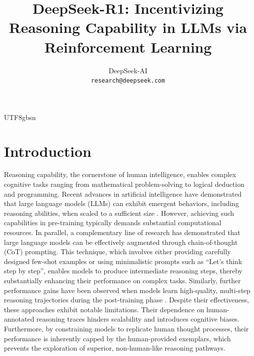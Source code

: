\documentclass[11pt, a4paper, logo, copyright, nonumbering]{deepseek}
\title{\centering DeepSeek-R1: Incentivizing Reasoning Capability in LLMs via Reinforcement Learning}
\author[*]{
DeepSeek-AI
\\
\small
\texttt{research@deepseek.com}
}
\begin{document}
\begin{CJK*}{UTF8}{gbsn}
\maketitle
{}





\section{Introduction}\label{sec1}
Reasoning capability, the cornerstone of human intelligence, enables complex cognitive tasks ranging from mathematical problem-solving to logical deduction and programming.  Recent advances in artificial intelligence have demonstrated that large language models (LLMs) can exhibit emergent behaviors, including reasoning abilities, when scaled to a sufficient size \citep{wei2022emergent, kaplan2020scaling}. However, achieving such capabilities in pre-training typically demands substantial computational resources.
 In parallel, a complementary line of research has demonstrated that large language models can be effectively augmented through chain-of-thought (CoT) prompting. This technique, which involves either providing carefully designed few-shot examples or using minimalistic prompts such as  “Let’s think step by step”\citep{wei2022chain,kojima2022large}, enables models to produce intermediate reasoning steps, thereby substantially enhancing their performance on complex tasks.
 Similarly, further performance gains have been observed when models learn high-quality, multi-step reasoning trajectories during the post-training phase \citep{gpt4,chung2024scaling}.
 Despite their effectiveness, these approaches exhibit notable limitations. Their dependence on human-annotated reasoning traces hinders scalability and introduces cognitive biases. Furthermore, by constraining models to replicate human thought processes, their performance is inherently capped by the human-provided exemplars, which prevents the exploration of superior, non-human-like reasoning pathways.



\end{CJK*}
\end{document}
